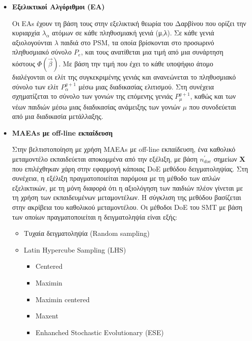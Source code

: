 \documentclass[twoside, 12pt,notitlepage]{report}
\begin{document}
\begin{itemize}
\item \textbf{Εξελικτικοί Αλγόριθμοι (ΕΑ)}

Οι ΕΑs\cite{EAs_app} έχουν τη βάση τους στην εξελικτική θεωρία του 
Δαρβίνου που ορίζει την κυριαρχία $λ_{α}$ ατόμων σε κάθε 
πληθυσμιακή γενιά (μ,λ). Σε κάθε γενιά αξιολογούνται $λ$ παιδιά στο 
PSM, τα οποία βρίσκονται στο προσωρινό πληθυσμιακό σύνολο $P_{e}$, 
και τους ανατίθεται μια τιμή από μια συνάρτηση κόστους 
$Φ(\vec{β})$. Με βάση την τιμή που έχει το κάθε υποψήφιο άτομο 
διαλέγονται οι ελίτ της συγκεκριμένης γενιάς και ανανεώνεται το 
πληθυσμιακό σύνολο των ελίτ $P_{α}^{g+1}$ μέσω μιας διαδικασίας 
ελιτισμού. Στη συνέχεια σχηματίζεται το σύνολο των γονιών της 
επόμενης γενιάς $P_{μ}^{g+1}$, καθώς και των νέων παιδιών μέσω μιας 
διαδικασίας ανάμειξης των γονιών $μ$ που συνοδεύεται από μια 
διαδικασία μετάλλαξης. 

\item \textbf{MAEAs με off-line εκπαίδευση} 

Στην βελτιστοποίηση με χρήση MAEAs με off-line εκπαίδευση, ένα 
καθολικό μεταμοντέλο εκπαιδεύεται αποκομμένα από την εξέλιξη, 
με βάση $n_{doe}^{'}$ σημείων $\mathbf{X}$ που επιλέχθηκαν χάρη 
στην εφαρμογή κάποιας DoE μεθόδου δειγματοληψίας. Στη συνέχεια, η 
εξέλιξη πραγματοποιείται παρόμοια με τη μέθοδο των απλών 
εξελικτικών, με τη μόνη διαφορά ότι η αξιολόγηση των παιδιών πλέον 
γίνεται με τη χρήση των εκπαιδευμένων μεταμοντέλων. Η σύγκλιση της 
μεθόδου βασίζεται στην ακρίβεια του καθολικού μεταμοντέλου. Οι 
μέθοδοι DoE του SMT με βάση των οποίων πραγματοποιείται η 
δειγματοληψία είναι εξής:

\begin{itemize}
\item Τυχαία δειγματοληψία (Random sampling)\cite{Random_app}

\item Latin Hypercube Sampling (LHS)\cite{LHS_app}

\begin{itemize}
\item Centered

\item Maximin\cite{maximin_app}

\item Maximin centered

\item Maxent\cite{max_entropy_app}

\item Enhanched Stochastic Evolutionary (ESE)\cite{ESE_app}
\end{itemize}


\end{itemize}
\end{itemize}
\end{document}
